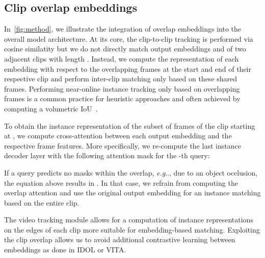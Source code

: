 \documentclass{article}
\makeatletter
\theoremstyle{plain}
\theoremstyle{definition}
\theoremstyle{remark}
\DeclareRobustCommand\onedot{\futurelet\@let@token\@onedot}
\def\@onedot{\ifx\@let@token.\else.\null\fi\xspace}
\def\eg{\emph{e.g}\onedot} \def\Eg{\emph{E.g}\onedot}
\makeatother
\begin{document}
\subsection{Clip overlap embeddings}
In~\cref{fig:method}, we illustrate the integration of overlap embeddings into the overall model architecture.
At its core, the clip-to-clip tracking is performed via cosine similatity but we do not directly match output embeddings  and  of two adjacent clips with length .
Instead, we compute the representation of each embedding with respect to the overlapping frames  at the start and end of their respective clip and perform inter-clip matching only based on these shared frames.
Performing near-online instance tracking only based on overlapping frames is a common practice for heuristic approaches and often achieved by computing a volumetric IoU~\cite{mask_prop,stem_seg,devis}.

To obtain the instance representation  of the subset of frames  of the clip starting at , we compute cross-attention between each output embedding and the respective frame features.
More specifically, we re-compute the last instance decoder layer  with the following attention mask for the -th query:

If a query predicts no masks within the overlap, \eg, due to an object occlusion, the equation above results in .
In that case, we refrain from computing the overlap attention and use the original output embedding for an instance matching based on the entire clip.

The video tracking module allows for a computation of instance representations on the edges of each clip more suitable for embedding-based matching.
Exploiting the clip overlap allows us to avoid additional contrastive learning between embeddings as done in IDOL or VITA.
\end{document}

